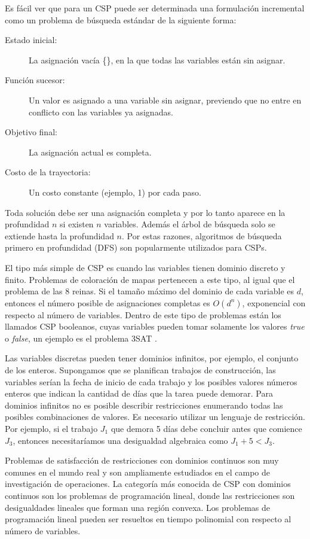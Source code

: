 Es f\'acil ver que para un CSP puede ser determinada una formulaci\'on incremental como un problema de búsqueda est\'andar de la siguiente forma:

\begin{description}
	\item[Estado inicial:] La asignaci\'on vac\'ia \{\}, en la que todas las variables est\'an sin asignar.
	\item[Funci\'on sucesor:] Un valor es asignado a una variable sin asignar, previendo que no entre en conflicto con las variables ya asignadas.
	\item[Objetivo final:] La asignaci\'on actual es completa.
	\item[Costo de la trayectoria:] Un costo constante (ejemplo, 1) por cada paso.
\end{description}

Toda soluci\'on debe ser una asignaci\'on completa y por lo tanto aparece en la profundidad $n$ si existen $n$ variables. Adem\'as el \'arbol de búsqueda solo se extiende hasta la profundidad $n$. Por estas razones, algoritmos de b\'usqueda primero en profundidad (DFS) son popularmente utilizados para CSPs.

El tipo m\'as simple de CSP es cuando las variables tienen dominio discreto y finito. Problemas de coloraci\'on de mapas pertenecen a este tipo, al igual que el problema de las 8 reinas. Si el tamaño m\'aximo del dominio de cada variable es $d$, entonces el n\'umero posible de asignaciones completas es $O(d^{n})$, exponencial con respecto al n\'umero de variables. Dentro de este tipo de problemas est\'an los llamados CSP booleanos, cuyas variables pueden tomar solamente los valores \emph{true} o \emph{false}, un ejemplo es el problema 3SAT \cite{Carla P. Gomes}.

Las variables discretas pueden tener dominios infinitos, por ejemplo, el conjunto de los enteros. Supongamos que se planifican trabajos de construcci\'on, las variables ser\'ian la fecha de inicio de cada trabajo y los posibles valores n\'umeros enteros que indican la cantidad de d\'ias que la tarea puede demorar. Para dominios infinitos no es posible describir restricciones enumerando todas las posibles combinaciones de valores. Es necesario utilizar un lenguaje de restricci\'on. Por ejemplo, si el trabajo $J_{1}$ que demora 5 d\'ias debe concluir antes que comience $J_{3}$, entonces necesitaríamos una desigualdad algebraica como $J_{1} + 5 < J_{3}$.

Problemas de satisfacci\'on de restricciones con dominios continuos son muy comunes en el mundo real y son ampliamente estudiados en el campo de investigaci\'on de operaciones. La categor\'ia m\'as conocida de CSP con dominios continuos son los problemas de programaci\'on lineal, donde las restricciones son desigualdades lineales que forman una regi\'on convexa. Los problemas de programaci\'on lineal pueden ser resueltos en tiempo polinomial con respecto al n\'umero de variables.

